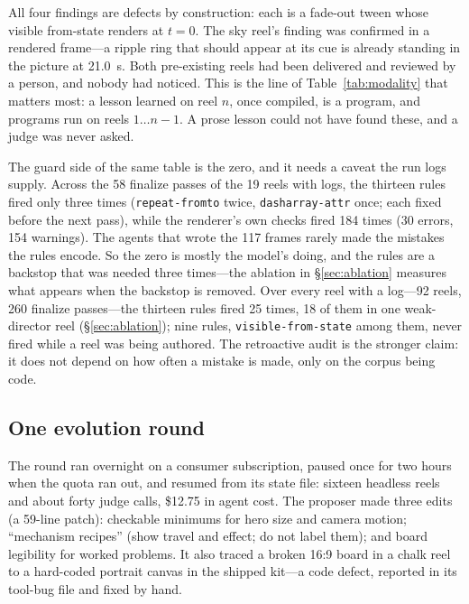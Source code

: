 \documentclass[11pt]{article}
\begin{document}
All four findings are defects by construction: each is a fade-out tween whose visible from-state
renders at $t=0$. The sky reel's finding was confirmed in a rendered frame---a ripple ring that should
appear at its cue is already standing in the picture at 21.0~s. Both pre-existing reels had been
delivered and reviewed by a person, and nobody had noticed. This is the line of Table~\ref{tab:modality}
that matters most: a lesson learned on reel $n$, once compiled, is a program, and programs run on reels
$1 \ldots n-1$. A prose lesson could not have found these, and a judge was never asked.

The guard side of the same table is the zero, and it needs a caveat the run logs supply. Across the
58 finalize passes of the 19 reels with logs, the thirteen rules fired only three times
(\texttt{repeat-fromto} twice, \texttt{dasharray-attr} once; each fixed before the next pass), while
the renderer's own checks fired 184 times (30 errors, 154 warnings). The agents that wrote the 117
frames rarely made the mistakes the rules encode. So the zero is mostly the model's doing, and the
rules are a backstop that was needed three times---the ablation in \S\ref{sec:ablation} measures what
appears when the backstop is removed. Over every reel with a log---92 reels, 260 finalize passes---the thirteen rules fired 25 times, 18 of
them in one weak-director reel (\S\ref{sec:ablation}); nine rules, \texttt{visible-from-state} among
them, never fired while a reel was being authored. The retroactive audit is the stronger claim: it
does not depend on how often a mistake is made, only on the corpus being code.

\subsection{One evolution round}
\label{sec:evolve}
The round ran overnight on a consumer subscription, paused once for two hours when the quota ran
out, and resumed from its state file: sixteen headless reels and about forty judge calls, \$12.75 in
agent cost. The proposer made three edits (a 59-line patch): checkable minimums for hero size and
camera motion; ``mechanism recipes'' (show travel and effect; do not label them); and board legibility
for worked problems. It also traced a broken 16:9 board in a chalk reel to a hard-coded portrait
canvas in the shipped kit---a code defect, reported in its tool-bug file and fixed by hand.
\end{document}
